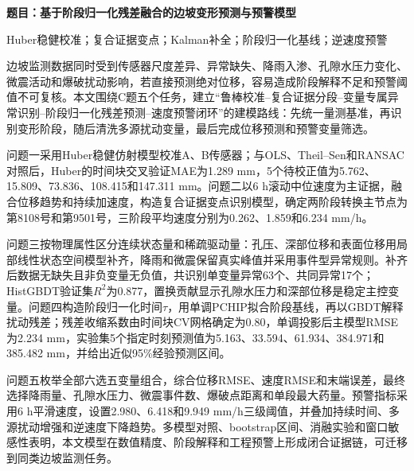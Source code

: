 \thispagestyle{empty}

\begin{center}
{\heiti\sanhao[1]\bfseries 题目：基于阶段归一化残差融合的边坡变形预测与预警模型}\par
\end{center}

\vspace{3mm}
Huber稳健校准；复合证据变点；Kalman补全；阶段归一化基线；逆速度预警

\vspace{3mm}

边坡监测数据同时受到传感器尺度差异、异常缺失、降雨入渗、孔隙水压力变化、微震活动和爆破扰动影响，若直接预测绝对位移，容易造成阶段解释不足和预警阈值不可复核。本文围绕C题五个任务，建立“鲁棒校准--复合证据分段--变量专属异常识别--阶段归一化残差预测--速度预警闭环”的建模路线：先统一量测基准，再识别变形阶段，随后清洗多源扰动变量，最后完成位移预测和预警变量筛选。

问题一采用Huber稳健仿射模型校准A、B传感器；与OLS、Theil--Sen和RANSAC对照后，Huber的时间块交叉验证MAE为1.289 mm，5个待校正值为5.762、15.809、73.836、108.415和147.311 mm。问题二以6 h滚动中位速度为主证据，融合位移趋势和持续加速度，构造复合证据变点识别模型，确定两阶段转换主节点为第8108号和第9501号，三阶段平均速度分别为0.262、1.859和6.234 mm/h。

问题三按物理属性区分连续状态量和稀疏驱动量：孔压、深部位移和表面位移用局部线性状态空间模型补齐，降雨和微震保留真实峰值并采用事件型异常规则。补齐后数据无缺失且非负变量无负值，共识别单变量异常63个、共同异常17个；HistGBDT验证集$R^2$为0.877，置换贡献显示孔隙水压力和深部位移是稳定主控变量。问题四构造阶段归一化时间$\tau$，用单调PCHIP拟合阶段基线，再以GBDT解释扰动残差；残差收缩系数由时间块CV网格确定为0.80，单调投影后主模型RMSE为2.234 mm，实验集5个指定时刻预测值为5.163、33.594、61.934、384.971和385.482 mm，并给出近似95\%经验预测区间。

问题五枚举全部六选五变量组合，综合位移RMSE、速度RMSE和末端误差，最终选择降雨量、孔隙水压力、微震事件数、爆破点距离和单段最大药量。预警指标采用6 h平滑速度，设置2.980、6.418和9.949 mm/h三级阈值，并叠加持续时间、多源扰动增强和逆速度下降趋势。多模型对照、bootstrap区间、消融实验和窗口敏感性表明，本文模型在数值精度、阶段解释和工程预警上形成闭合证据链，可迁移到同类边坡监测任务。

\clearpage
